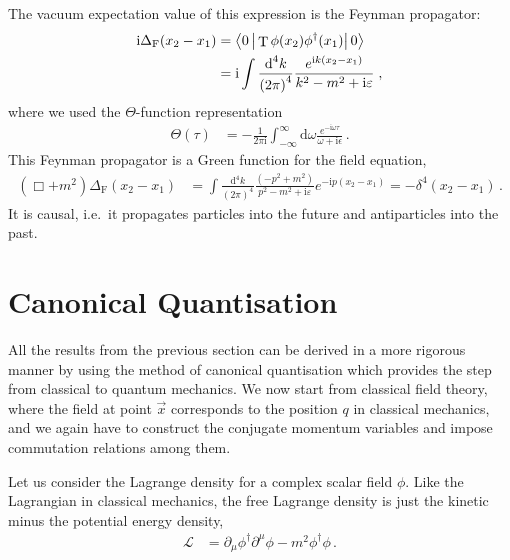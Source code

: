 \documentclass[12pt]{report}
\renewcommand{\L}{\ensuremath{\mathscr{L}}}
\renewcommand{\d}{\text{d}}
\newcommand{\braopket}[3]{\ensuremath{\left\langle#1\left|\vphantom{#1 #3} #2\right|#3 \right\rangle}}
\DeclareMathOperator{\T}{T}
\renewcommand{\i}{\ensuremath{\text{i}}}
\newcommand{\2}{\ensuremath{\sqrt{2}\,}}
\renewcommand{\d}{\ensuremath{\text{d}}}
\renewcommand{\L}{\ensuremath{\mathscr{L}}}
\begin{document}
{      The vacuum expectation value of this expression is the Feynman propagator:
      \begin{align}
        \begin{split}
          \i \Delta_\text{F} (x_2-x_1)&=\braopket{0}{\T \phi(x_2)\phi^\dagger(x_1)}{0}\\
          &= \i\int \frac{\d^4 k}{\left(2\pi\right)^4} \frac{e^{\i k (x_2-x_1)}}{k^2-m^2 +\i
            \varepsilon}\;, 
        \end{split}
      \end{align}
      where we used the $\Theta$-function representation
      \begin{align}
        \Theta(\tau)&= -\frac{1}{2\pi\i} \int_{-\infty}^\infty \!\!\d \omega
        \frac{e^{-\i\omega\tau}}{\omega+\i\epsilon} \,.
      \end{align}
      This Feynman propagator is a Green function for the field equation,
      \begin{align}
          \left(\Box + m^2\right) \Delta_\text{F} (x_2-x_1) &=\int \frac{\d^4
            k}{\left(2\pi\right)^4} \frac{\left(-p^2 +m^2\right)}{p^2-m^2 +\i \varepsilon} e^{-\i
            p\left(x_2-x_1\right)} = -\delta^4\left(x_2-x_1\right)\,.
      \end{align}
      It is causal,  i.e.\ it propagates particles into the future and antiparticles into the
      past. 

      \section{Canonical Quantisation}
      All the results from the previous section can be derived in a more rigorous manner by  
      using the method of canonical quantisation which provides the step from classical to quantum
      mechanics. We now start from classical field theory, where the field at point $\vec{x}$
      corresponds to the position $q$ in classical mechanics, and we again have to construct the 
      conjugate momentum variables and impose commutation relations among them.

      Let us consider the Lagrange density
      for a complex scalar field $\phi$. Like the Lagrangian in classical mechanics, the
      free Lagrange density is just the kinetic minus the potential energy density,
      \begin{align}\label{eq:Lscalarfree}
        \L&= \partial_\mu \phi^\dagger \partial^\mu \phi- m^2 \phi^\dagger \phi\,.
      \end{align}
      
}
\end{document}
